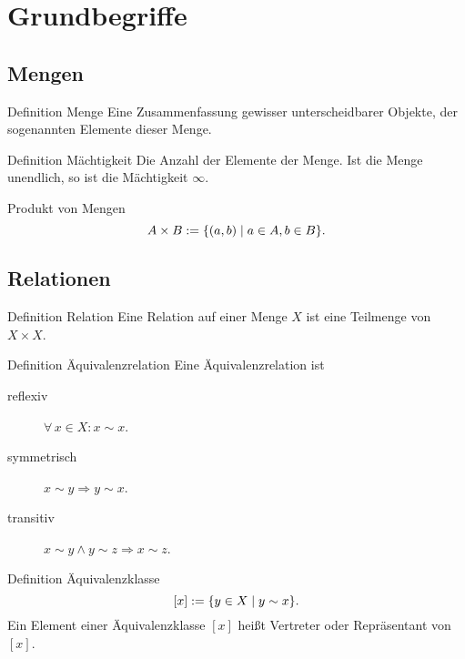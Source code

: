 \documentclass[a6paper,11pt,print,grid=front]{kartei}
\begin{document}
\section*{Grundbegriffe}
\subsection*{Mengen}

\begin{karte}{Definition Menge}
    Eine Zusammenfassung gewisser unterscheidbarer Objekte, 
    der sogenannten Elemente dieser Menge.
\end{karte}
\begin{karte}{Definition Mächtigkeit}
    Die Anzahl der Elemente der Menge. Ist die Menge unendlich, 
    so ist die Mächtigkeit \( \infty \).
\end{karte}
\begin{karte}{Produkt von Mengen}
    \[ A \times B := \{ (a,b) \;\vert \; 
    a \in A, b \in B \}. \]
\end{karte}
\subsection*{Relationen}
\begin{karte}{Definition Relation}
    Eine Relation auf einer Menge \(X\)  ist eine Teilmenge 
    von \( X \times X \).
\end{karte}
\begin{karte}{Definition Äquivalenzrelation}
    Eine Äquivalenzrelation ist 
    \begin{description}
        \item[reflexiv] \( \forall \, x \in X : x \sim x \).
        \item[symmetrisch] \( x \sim y \Rightarrow y \sim x \).
        \item[transitiv] \( x \sim y \wedge y \sim z \Rightarrow 
        x \sim z \).
    \end{description}
\end{karte}
\begin{karte}{Definition Äquivalenzklasse}
    \[ [ x ] := \{ y \in X \;\vert \; y \sim x \}. \]
    Ein Element einer Äquivalenzklasse \( [x] \) heißt 
    Vertreter oder Repräsentant von \( [x] \).
\end{karte}
\end{document}
